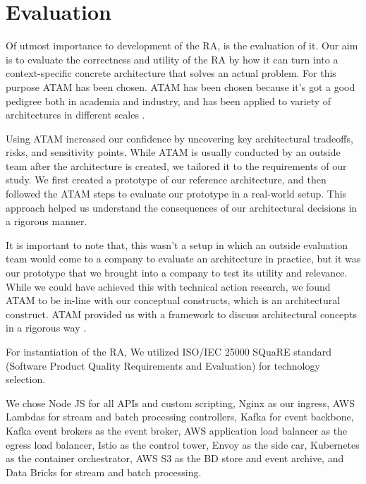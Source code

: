 \documentclass[conference]{IEEEtran}
\begin{document}

\section*{Evaluation}

Of utmost importance to development of the RA, is the evaluation of it. Our aim is to evaluate the correctness and utility of the RA by how it can turn into a context-specific concrete architecture that solves an actual problem. For this purpose ATAM has been chosen. ATAM has been chosen because it's got a good pedigree both in academia and industry, and has been applied to variety of architectures in different scales \cite{SoftwareArchitectureKazman}. 

Using ATAM increased our confidence by uncovering key architectural tradeoffs, risks, and sensitivity points. While ATAM is usually conducted by an outside team after the architecture is created, we tailored it to the requirements of our study. We first created a prototype of our reference architecture, and then followed the ATAM steps to evaluate our prototype in a real-world setup. This approach helped us understand the consequences of our architectural decisions in a rigorous manner.

It is important to note that, this wasn't a setup in which an outside evaluation team would come to a company to evaluate an architecture in practice, but it was our prototype that we brought into a company to test its utility and relevance. While we could have achieved this with technical action research, we found ATAM to be in-line with our conceptual constructs, which is an architectural construct. ATAM provided us with a framework to discuss architectural concepts in a rigorous way \cite{wieringa2014design}. 

For instantiation of the RA, We utilized ISO/IEC 25000 SQuaRE standard (Software Product Quality Requirements and Evaluation) \cite{ISO25000} for technology selection. 


We chose Node JS for all APIs and custom scripting, Nginx as our ingress, AWS Lambdas for stream and batch processing controllers, Kafka for event backbone, Kafka event brokers as the event broker, AWS application load balancer as the egress load balancer, Istio as the control tower, Envoy as the side car, Kubernetes as the container orchestrator, AWS S3 as the BD store and event archive, and Data Bricks for stream and batch processing. 
\end{document}
